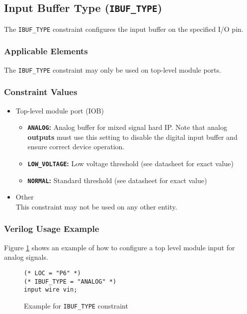 \documentclass[11pt]{article}
\renewcommand\emph\textbf
\newcommand{\tokenstyle}[1]{\texttt{#1}}
\newcommand{\valuestyle}[1]{\texttt{#1}}
\newcommand{\strvaluestyle}[1]{\valuestyle{\textquotedbl#1\textquotedbl}}
\newcommand{\strexamplestyle}[1]{\textbf{\strvaluestyle{#1}:}}
\newcommand{\whenstyle}[1]{{\fontseries{sb}\selectfont#1}}
\begin{document}

\pagebreak
\subsection{Input Buffer Type (\tokenstyle{IBUF\_TYPE})}

The \tokenstyle{IBUF\_TYPE} constraint configures the input buffer on the specified I/O pin.

\subsubsection{Applicable Elements}
The \tokenstyle{IBUF\_TYPE} constraint may only be used on top-level module ports.

\subsubsection{Constraint Values}
\begin{itemize}
\item \whenstyle{Top-level module port (IOB)}
	\begin{itemize}
		\item \strexamplestyle{ANALOG} Analog buffer for mixed signal hard IP. Note that analog \emph{outputs} must use this setting
		to disable the digital input buffer and ensure correct device operation.
		\item \strexamplestyle{LOW\_VOLTAGE} Low voltage threshold (see datasheet for exact value)
		\item \strexamplestyle{NORMAL} Standard threshold (see datasheet for exact value)
	\end{itemize}
\item \whenstyle{Other} \\
This constraint may not be used on any other entity.
\end{itemize}

\subsubsection{Verilog Usage Example}

Figure \ref{constraint-ibuftype} shows an example of how to configure a top level module input for analog signals.

\begin{figure}[h]
\begin{lstlisting}
(* LOC = "P6" *)
(* IBUF_TYPE = "ANALOG" *)
input wire vin;
\end{lstlisting}
\caption{Example for \tokenstyle{IBUF\_TYPE} constraint}
\label{constraint-ibuftype}
\end{figure}
\end{document}
